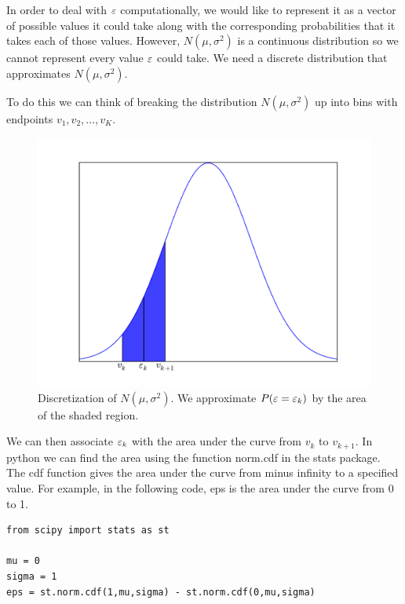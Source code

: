 In order to deal with $\varepsilon$ computationally, we would like to represent it as a vector of possible values it could take along with the corresponding probabilities that it takes each of those values.  However, $N(\mu,\sigma^2)$ is a continuous distribution so we cannot represent every value $\varepsilon$ could take.  We need a discrete distribution that approximates $N(\mu,\sigma^2)$.

To do this we can think of breaking the distribution $N(\mu,\sigma^2)$ up into bins with endpoints $v_1,v_2,\ldots, v_K$.

\begin{figure}[h!]
\label{stoch1_fig1}
\begin{center}
\includegraphics[scale = 0.5]{discnorm.pdf}
\end{center}
\caption{Discretization of $N(\mu,\sigma^2)$.  We approximate $P(\varepsilon = \varepsilon_k)$ by the area of the shaded region.}
\end{figure}

We can then associate $\varepsilon_k$ with the area under the curve from $v_k$ to $v_{k+1}$.  In python we can find the area using the function norm.cdf in the stats package.  The cdf function gives the area under the curve from minus infinity to a specified value.  For example, in the following code, eps is the area under the curve from 0 to 1.

\begin{lstlisting}[style=python]
from scipy import stats as st

mu = 0
sigma = 1
eps = st.norm.cdf(1,mu,sigma) - st.norm.cdf(0,mu,sigma)
\end{lstlisting}

